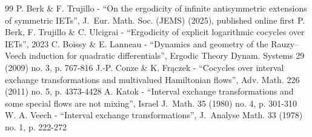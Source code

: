 \begin{thebibliography}{99}
 P. Berk \& F. Trujillo - “On the ergodicity of infinite antisymmetric extensions of symmetric IETs”, J. Eur. Math. Soc. (JEMS) (2025), published online first
 P. Berk, F. Trujillo \& C. Ulcigrai - “Ergodicity of explicit logarithmic cocycles over IETs”, 2023
 C. Boissy \& E. Lanneau - “Dynamics and geometry of the Rauzy–Veech induction for quadratic differentials”, Ergodic Theory Dynam. Systems 29 (2009) no. 3, p. 767-816
 J.-P. Conze \& K. Frączek - “Cocycles over interval exchange transformations and multivalued Hamiltonian flows”, Adv. Math. 226 (2011) no. 5, p. 4373-4428
 A. Katok - “Interval exchange transformations and some special flows are not mixing”, Israel J. Math. 35 (1980) no. 4, p. 301-310
 W. A. Veech - “Interval exchange transformations”, J. Analyse Math. 33 (1978) no. 1, p. 222-272
\end{thebibliography}
